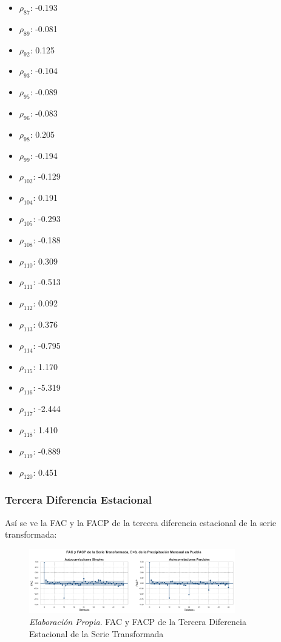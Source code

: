 \documentclass[12pt,letterpaper]{article}   %
\begin{document}
\begin{multicols}{5}
\begin{itemize}
    \item $\rho_{87}$: -0.193
    \item $\rho_{89}$: -0.081
    \item $\rho_{92}$: 0.125
    \item $\rho_{93}$: -0.104
    \item $\rho_{95}$: -0.089
    \item $\rho_{96}$: -0.083
    \item $\rho_{98}$: 0.205
    \item $\rho_{99}$: -0.194
    \item $\rho_{102}$: -0.129
    \item $\rho_{104}$: 0.191
    \item $\rho_{105}$: -0.293
    \item $\rho_{108}$: -0.188
    \item $\rho_{110}$: 0.309
    \item $\rho_{111}$: -0.513
    \item $\rho_{112}$: 0.092
    \item $\rho_{113}$: 0.376
    \item $\rho_{114}$: -0.795
    \item $\rho_{115}$: 1.170
    \item $\rho_{116}$: -5.319
    \item $\rho_{117}$: -2.444
    \item $\rho_{118}$: 1.410
    \item $\rho_{119}$: -0.889
    \item $\rho_{120}$: 0.451
\end{itemize}
\end{multicols}













  \subsubsection{Tercera Diferencia Estacional}

Así se ve la FAC y la FACP de la tercera diferencia estacional de la serie transformada:

\begin{figure}[ht]
    \centering
    \includegraphics[width=0.8\textwidth]{imagenes/03-12-fac-facp-serie-D3.pdf}
    \caption{\textit{Elaboración Propia}. FAC y FACP de la Tercera Diferencia Estacional de la Serie Transformada}
\end{figure}
\end{document}
